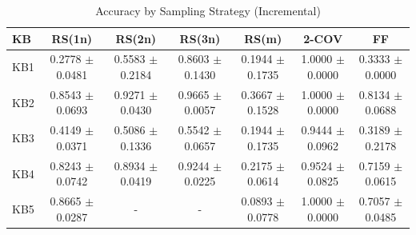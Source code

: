 \begin{table}[htbp]
\centering
\caption{Accuracy by Sampling Strategy (Incremental)}
\label{tab:accuracy_incremental}
\begin{tabular}{lcccccc}
\toprule
KB & RS(1n) & RS(2n) & RS(3n) & RS(m) & 2-COV & FF \\
\midrule
KB1 & 0.2778 $\pm$ 0.0481 & 0.5583 $\pm$ 0.2184 & 0.8603 $\pm$ 0.1430 & 0.1944 $\pm$ 0.1735 & 1.0000 $\pm$ 0.0000 & 0.3333 $\pm$ 0.0000 \\
KB2 & 0.8543 $\pm$ 0.0693 & 0.9271 $\pm$ 0.0430 & 0.9665 $\pm$ 0.0057 & 0.3667 $\pm$ 0.1528 & 1.0000 $\pm$ 0.0000 & 0.8134 $\pm$ 0.0688 \\
KB3 & 0.4149 $\pm$ 0.0371 & 0.5086 $\pm$ 0.1336 & 0.5542 $\pm$ 0.0657 & 0.1944 $\pm$ 0.1735 & 0.9444 $\pm$ 0.0962 & 0.3189 $\pm$ 0.2178 \\
KB4 & 0.8243 $\pm$ 0.0742 & 0.8934 $\pm$ 0.0419 & 0.9244 $\pm$ 0.0225 & 0.2175 $\pm$ 0.0614 & 0.9524 $\pm$ 0.0825 & 0.7159 $\pm$ 0.0615 \\
KB5 & 0.8665 $\pm$ 0.0287 & - & - & 0.0893 $\pm$ 0.0778 & 1.0000 $\pm$ 0.0000 & 0.7057 $\pm$ 0.0485 \\
\bottomrule
\end{tabular}
\end{table}

